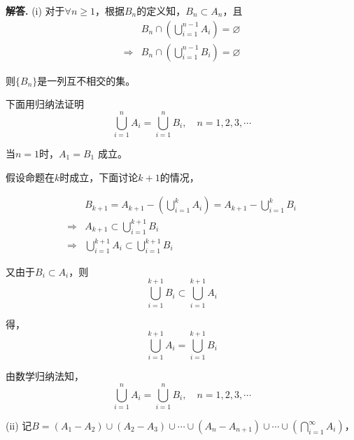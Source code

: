 \documentclass[12pt, a4paper, oneside]{ctexart}
\newenvironment{solution}{\par\noindent\textbf{解答. }}{\bigskip\par}
\begin{document}
\begin{solution}
    (i) 对于$\forall n \geqslant 1$，根据$B_n$的定义知，$B_n\subset A_n$，且\begin{equation*}
        \begin{aligned}
            &B_n\cap\left(\bigcup_{i=1}^{n-1}A_i\right) = \varnothing\\
            \Rightarrow&B_n\cap\left(\bigcup_{i=1}^{n-1}B_i\right)=\varnothing
        \end{aligned}
    \end{equation*}

    则$\{B_n\}$是一列互不相交的集。

    下面用归纳法证明
    \begin{equation*}
        \bigcup_{i=1}^{n}A_i=\bigcup_{i=1}^{n}B_i,\quad n=1,2,3,\cdots
    \end{equation*}
    
    当$n=1$时，$A_1=B_1$ 成立。

    假设命题在$k$时成立，下面讨论$k+1$的情况，

    \begin{equation*}
        \begin{aligned}
            &B_{k+1} = A_{k+1}-\left(\bigcup_{i=1}^kA_i\right)=A_{k+1}-\bigcup_{i=1}^kB_i\\
            \Rightarrow&A_{k+1}\subset \bigcup_{i=1}^{k+1}B_i\\
            \Rightarrow&\bigcup_{i=1}^{k+1}A_i\subset\bigcup_{i=1}^{k+1}B_i
        \end{aligned}
    \end{equation*}
    
    又由于$B_i\subset A_i$，则
    \begin{equation*}
        \bigcup_{i=1}^{k+1}B_i\subset\bigcup_{i=1}^{k+1}A_i
    \end{equation*}

    得，
    \begin{equation*}
        \bigcup_{i=1}^{k+1}A_i=\bigcup_{i=1}^{k+1}B_i
    \end{equation*}

    由数学归纳法知，
    \begin{equation*}
        \bigcup_{i=1}^{n}A_i=\bigcup_{i=1}^{n}B_i,\quad n=1,2,3,\cdots
    \end{equation*}

    (ii) 记$B = (A_1-A_2)\cup(A_2-A_3)\cup\cdots\cup(A_n-A_{n+1})\cup\cdots\cup(\bigcap_{i=1}^{\infty}A_i)$，
    

\end{solution}
\end{document}
